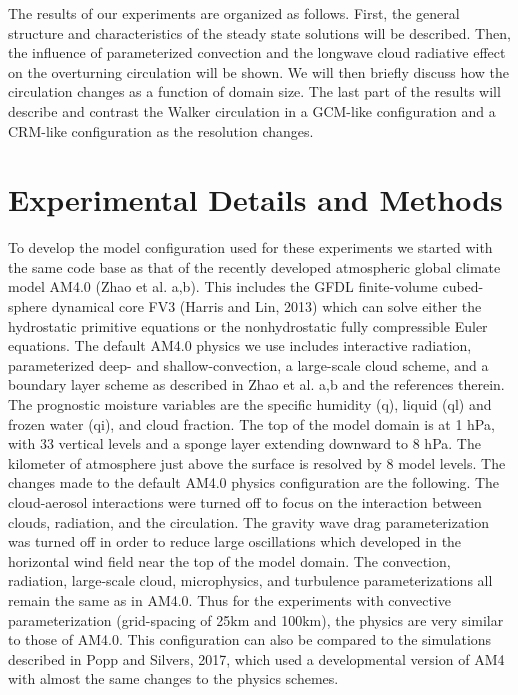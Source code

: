 \documentclass[11pt]{article}   	%
\begin{document}
The results of our experiments are organized as follows.  First, the general structure and characteristics of the steady state solutions
will be described.   Then, the influence of parameterized convection and the longwave cloud radiative effect on the overturning 
circulation will be shown.  We will then briefly discuss how the circulation changes as a function of domain size.  The last part of the
results will describe and contrast the Walker circulation in a GCM-like configuration and a CRM-like configuration as the 
resolution changes.

\section{Experimental Details and Methods}

To develop the model configuration used for these experiments we started with the same code base as that of the 
recently developed atmospheric global climate model AM4.0 
(Zhao et al. a,b).  This includes the GFDL finite-volume cubed-sphere dynamical core FV3 (Harris and Lin, 2013) 
which can solve either the hydrostatic primitive equations or the nonhydrostatic fully compressible Euler equations.  
The default AM4.0 physics we use includes interactive radiation, parameterized deep- and shallow-convection, 
a large-scale cloud scheme, and a boundary layer 
scheme as described in Zhao et al. a,b and the references therein.  The prognostic moisture variables are the specific 
humidity (q), liquid (ql) and frozen water (qi), and cloud fraction.  The top of the model domain is at 1 hPa, with 33 vertical 
levels and a sponge layer extending downward to 8 hPa.  The kilometer of atmosphere just above the surface is resolved by 
8 model levels.  The changes made to the default AM4.0 physics configuration are the following.  The cloud-aerosol 
interactions were turned off to focus on the interaction between clouds, radiation, and the circulation.  The gravity wave drag 
parameterization was turned off 
in order to reduce large oscillations which developed in the horizontal wind field near the top of the model domain.  
The convection, radiation, large-scale cloud, microphysics, and turbulence parameterizations all remain the same 
as in AM4.0.   Thus for the experiments with convective parameterization (grid-spacing of 25km and 100km), the 
physics are very similar to those of AM4.0.  This configuration can also be compared to the simulations described in 
Popp and Silvers, 2017, which used a developmental version of AM4 with almost the same changes to the physics
schemes.
\end{document}
